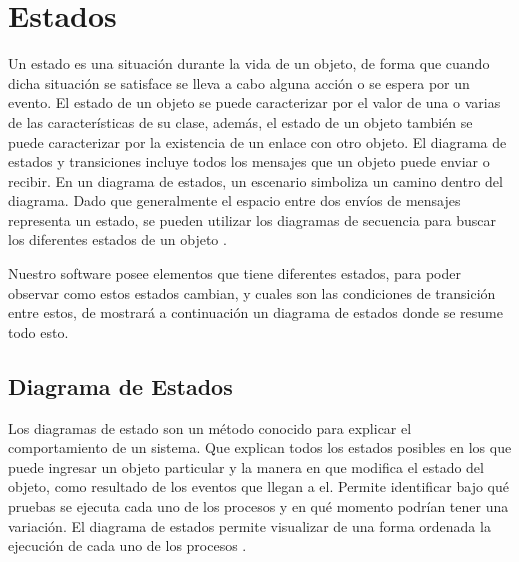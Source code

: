 \chapter{Estados}

Un estado es una situación durante la vida de un objeto, de forma que cuando dicha situación se satisface se lleva a cabo alguna acción o se espera por un evento. El estado de un objeto se puede caracterizar por el valor de una o varias de las características de su clase, además, el estado de un objeto también se puede caracterizar por la existencia de un enlace con otro objeto. El diagrama de estados y transiciones incluye todos los mensajes que un objeto puede enviar o recibir. En un diagrama de estados, un escenario simboliza un camino dentro del diagrama. Dado que generalmente el espacio entre dos envíos de mensajes representa un estado, se pueden utilizar los diagramas de secuencia para buscar los diferentes estados de un objeto \cite{Pw5DE}.

Nuestro software posee elementos que tiene diferentes estados, para poder observar como estos estados cambian, y cuales son las condiciones de transición entre estos, de mostrará a continuación un diagrama de estados donde se resume todo esto.

\section{Diagrama de Estados}

Los diagramas de estado son un método conocido para explicar el comportamiento de un sistema. Que explican todos los estados posibles en los que puede ingresar un objeto particular y la manera en que modifica el estado del objeto, como resultado de los eventos que llegan a el. Permite identificar bajo qué pruebas se ejecuta cada uno de los procesos y en qué momento podrían tener una variación. El diagrama de estados permite visualizar de una forma ordenada la ejecución de cada uno de los procesos \cite{Pw5DE}.

